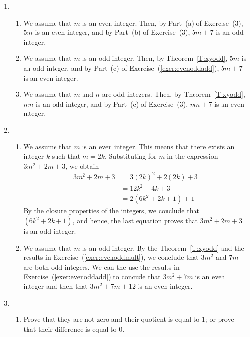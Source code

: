 \begin{enumerate}
\item \begin{enumerate} %
\item We assume that $m$ is an even integer.  Then, by Part~(a) of 
Exercise~(3), $5m$ is an even integer, and by Part~(b) of 
Exercise~(3), $5m + 7$ is an odd integer.

\item We assume that $m$ is an odd integer.  Then, by Theorem~\ref{T:xyodd}, $5m$ is an odd integer, and by Part~(c) of Exercise~(\ref{exer:evenoddadd}), $5m + 7$ is an even integer.

\item We assume that $m$ and $n$ are odd integers.  Then, by Theorem~\ref{T:xyodd}, $mn$ is an odd integer, and by Part~(c) of Exercise~(3), $mn + 7$ is an even integer.
\end{enumerate}


\item \begin{enumerate} 
\item We assume that $m$ is an even integer.  This means that there exists an integer $k$ such that $m = 2k$.  Substituting for $m$ in the expression $3m^2 + 2m + 3$, we obtain
\begin{align*}
3m^2 + 2m + 3 &= 3 \left( 2k \right)^2 + 2 \left( 2k \right) + 3 \\
              &= 12k^2 + 4k + 3 \\
              &= 2 \left( 6k^2 + 2k +1 \right) + 1
\end{align*}
By the closure properties of the integers, we conclude that $\left( 6k^2 + 2k +1 \right)$, and hence, the last equation proves that $3m^2 + 2m + 3$ is an odd integer.

\item We assume that $m$ is an odd integer.  By the Theorem~\ref{T:xyodd} and the results in Exercise~(\ref{exer:evenoddmult}), we conclude that $3m^2$ and $7m$ are both odd integers.  We can the use the results in Exercise~(\ref{exer:evenoddadd}) to concude that 
$3m^2 + 7m$ is an even integer and then that $3m^2 + 7m + 12$ is an even integer.
\end{enumerate}



\item \begin{enumerate} 
\item Prove that they are not zero and their quotient is equal to 1; or prove that their difference is equal to 0.


\end{enumerate}
\end{enumerate}
